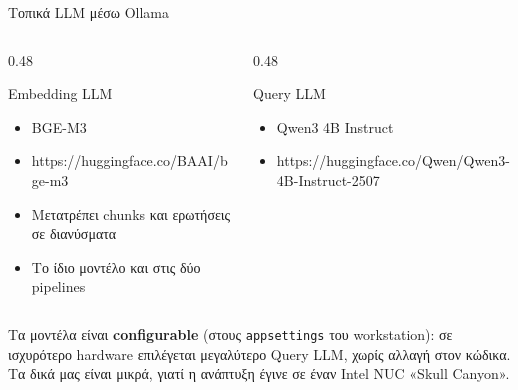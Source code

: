 \documentclass[aspectratio=169,11pt]{beamer}
\begin{document}
\begin{frame}{Τοπικά LLM μέσω Ollama}
  \begin{columns}[T]
    \begin{column}{0.48\textwidth}
      \begin{block}{Embedding LLM}
        \small
        \begin{itemize}
          \item BGE-M3
          \item https://huggingface.co/BAAI/bge-m3
          \item Μετατρέπει chunks και ερωτήσεις σε διανύσματα
          \item Το ίδιο μοντέλο και στις δύο pipelines
        \end{itemize}
      \end{block}
    \end{column}
    \begin{column}{0.48\textwidth}
      \begin{block}{Query LLM}
        \small
        \begin{itemize}
          \item Qwen3 4B Instruct
 	   \item https://huggingface.co/Qwen/Qwen3-4B-Instruct-2507
        \end{itemize}
      \end{block}
    \end{column}
  \end{columns}
  \vspace{2mm}
  \small Τα μοντέλα είναι \textbf{configurable} (στους \texttt{appsettings}
  του workstation): σε ισχυρότερο hardware επιλέγεται μεγαλύτερο Query LLM,
  χωρίς αλλαγή στον κώδικα. Τα δικά μας είναι μικρά, γιατί η ανάπτυξη έγινε
  σε έναν Intel NUC «Skull Canyon».
  \vspace{1mm}


\end{frame}
\end{document}
